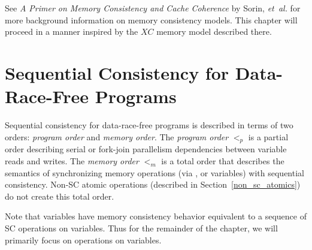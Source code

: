 See \textit{A Primer on Memory Consistency and Cache Coherence} by
Sorin, \emph{et~al.} for more background information on memory
consistency models. This chapter will proceed in a manner inspired by
the $XC$ memory model described there.






\section{Sequential Consistency for Data-Race-Free Programs}
\label{SC_for_DRF}

Sequential consistency for data-race-free programs is described in
terms of two orders: \textit{program order} and \textit{memory
order}. The \textit{program order} $<_p$ is a partial order describing
serial or fork-join parallelism dependencies between variable reads
and writes. The \textit{memory order} $<_m$ is a total order that
describes the semantics of synchronizing memory operations
(via ,  or  variables) with
sequential consistency. Non-SC atomic operations (described in
Section~\ref{non_sc_atomics}) do not create this total order.

Note that  variables have memory consistency
behavior equivalent to a sequence of SC operations on 
variables.  Thus for the remainder of the chapter, we will primarily
focus on operations on  variables.

